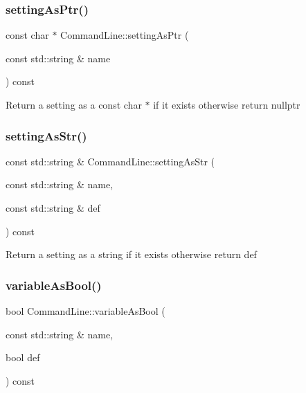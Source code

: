 \subsubsection{\texorpdfstring{setting\+As\+Ptr()}{settingAsPtr()}}
{\footnotesize\ttfamily const char $\ast$ Command\+Line\+::setting\+As\+Ptr (\begin{DoxyParamCaption}\item[{const std\+::string \&}]{name }\end{DoxyParamCaption}) const\hspace{0.3cm}{\ttfamily [noexcept]}}

Return a setting as a const char $\ast$ if it exists otherwise return nullptr \mbox{\label{classtheoria_1_1util_1_1CommandLine_ac398ce852930a3974f9ed6a1c5255975}} 
\subsubsection{\texorpdfstring{setting\+As\+Str()}{settingAsStr()}}
{\footnotesize\ttfamily const std\+::string \& Command\+Line\+::setting\+As\+Str (\begin{DoxyParamCaption}\item[{const std\+::string \&}]{name,  }\item[{const std\+::string \&}]{def }\end{DoxyParamCaption}) const}

Return a setting as a string if it exists otherwise return def \mbox{\label{classtheoria_1_1util_1_1CommandLine_a6d4d9be7adcf9ac15a1e5469535e97e9}} 
\subsubsection{\texorpdfstring{variable\+As\+Bool()}{variableAsBool()}}
{\footnotesize\ttfamily bool Command\+Line\+::variable\+As\+Bool (\begin{DoxyParamCaption}\item[{const std\+::string \&}]{name,  }\item[{bool}]{def }\end{DoxyParamCaption}) const}

